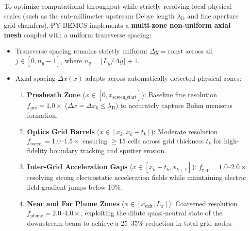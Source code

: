 \documentclass[11pt,a4paper]{article}
\newcommand{\PYBEMCS}{PY-BEMCS}
\begin{document}
To optimize computational throughput while strictly resolving local physical scales (such as the sub-millimeter upstream Debye length $\lambda_{\mathrm{D}}$ and fine aperture grid chamfers), \PYBEMCS{} implements a \textbf{multi-zone non-uniform axial mesh} coupled with a uniform transverse spacing:
\begin{itemize}[nosep]
    \item Transverse spacing remains strictly uniform: $\Delta y = \text{const}$ across all $j \in [0, n_y - 1]$, where $n_y = \lfloor L_y / \Delta y \rfloor + 1$.
    \item Axial spacing $\Delta x(x)$ adapts across automatically detected physical zones:
    \begin{enumerate}[nosep]
        \item \textbf{Presheath Zone} ($x \in [0, x_{\mathrm{screen\_start}}]$): Baseline fine resolution $f_{\mathrm{pre}} = 1.0\times$ ($\Delta x = \Delta x_0 \le \lambda_{\mathrm{D}}$) to accurately capture Bohm meniscus formation.
        \item \textbf{Optics Grid Barrels} ($x \in [x_k, x_k + t_k]$): Moderate resolution $f_{\mathrm{barrel}} = 1.0\text{--}1.5\times$ ensuring $\ge 15$ cells across grid thickness $t_k$ for high-fidelity boundary tracking and sputter erosion.
        \item \textbf{Inter-Grid Acceleration Gaps} ($x \in [x_k + t_k, x_{k+1}]$): $f_{\mathrm{gap}} = 1.0\text{--}2.0\times$ resolving strong electrostatic acceleration fields while maintaining electric field gradient jumps below $10\%$.
        \item \textbf{Near and Far Plume Zones} ($x \in [x_{\mathrm{exit}}, L_x]$): Coarsened resolution $f_{\mathrm{plume}} = 2.0\text{--}4.0\times$, exploiting the dilute quasi-neutral state of the downstream beam to achieve a $25\text{--}35\%$ reduction in total grid nodes.
    \end{enumerate}
\end{itemize}
\end{document}
